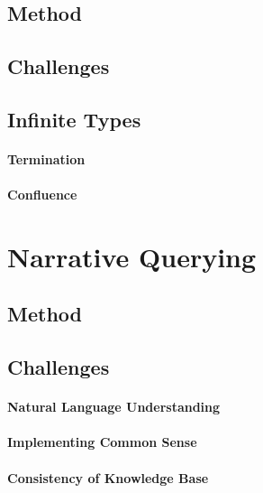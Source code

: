 \subsection{Method}

\subsection{Challenges}

\subsection{Infinite Types}

\paragraph{Termination}

\paragraph{Confluence}

\section{Narrative Querying}\label{sec:bolquery:narr}

\subsection{Method}

\subsection{Challenges}

\paragraph{Natural Language Understanding}

\paragraph{Implementing Common Sense}

\paragraph{Consistency of Knowledge Base}




